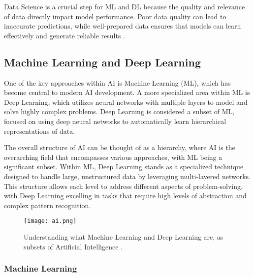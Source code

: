 Data Science is a crucial step for ML and DL because the quality and relevance of data directly impact model performance. Poor data quality can lead to inaccurate predictions, while well-prepared data ensures that models can learn effectively and generate reliable results \cite{bishop2006pattern}.

\subsection{Machine Learning and Deep Learning}
One of the key approaches within AI is Machine Learning (ML), which has become central to modern AI development. A more specialized area within ML is Deep Learning, which utilizes neural networks with multiple layers to model and solve highly complex problems. Deep Learning is considered a subset of ML, focused on using deep neural networks to automatically learn hierarchical representations of data.

The overall structure of AI can be thought of as a hierarchy, where AI is the overarching field that encompasses various approaches, with ML being a significant subset. Within ML, Deep Learning stands as a specialized technique designed to handle large, unstructured data by leveraging multi-layered networks. This structure allows each level to address different aspects of problem-solving, with Deep Learning excelling in tasks that require high levels of abstraction and complex pattern recognition.
\begin{figure}[H]
    \centering
    \texttt{[image: ai.png]}
    \caption{Understanding what Machine Learning and Deep Learning are, as subsets of Artificial Intelligence \cite{premierneurology2025image}.}
    \label{fig:ai}
\end{figure}

\subsubsection{Machine Learning}
